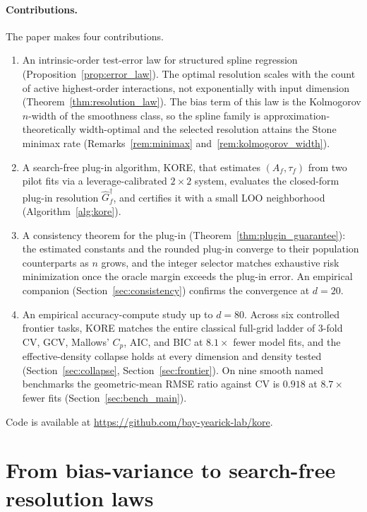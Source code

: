 \documentclass{article}
\newcommand{\KORE}{\textsc{KORE}}
\begin{document}
\paragraph{Contributions.}
The paper makes four contributions.
\begin{enumerate}
    \item An intrinsic-order test-error law for structured spline regression (Proposition~\ref{prop:error_law}). The optimal resolution scales with the count of active highest-order interactions, not exponentially with input dimension (Theorem~\ref{thm:resolution_law}). The bias term of this law is the Kolmogorov $n$-width of the smoothness class, so the spline family is approximation-theoretically width-optimal and the selected resolution attains the Stone minimax rate (Remarks~\ref{rem:minimax} and~\ref{rem:kolmogorov_width}).
    \item A search-free plug-in algorithm, \KORE{}, that estimates $(A_f, \tau_f)$ from two pilot fits via a leverage-calibrated $2\times2$ system, evaluates the closed-form plug-in resolution $\widehat{G}_f^\dagger$, and certifies it with a small LOO neighborhood (Algorithm~\ref{alg:kore}).
    \item A consistency theorem for the plug-in (Theorem~\ref{thm:plugin_guarantee}): the estimated constants and the rounded plug-in converge to their population counterparts as $n$ grows, and the integer selector matches exhaustive risk minimization once the oracle margin exceeds the plug-in error. An empirical companion (Section~\ref{sec:consistency}) confirms the convergence at $d = 20$.
    \item An empirical accuracy-compute study up to $d = 80$. Across six controlled frontier tasks, \KORE{} matches the entire classical full-grid ladder of $3$-fold CV, GCV, Mallows' $C_p$, AIC, and BIC at $8.1\times$ fewer model fits, and the effective-density collapse holds at every dimension and density tested (Section~\ref{sec:collapse}, Section~\ref{sec:frontier}). On nine smooth named benchmarks the geometric-mean RMSE ratio against CV is $0.918$ at $8.7\times$ fewer fits (Section~\ref{sec:bench_main}).
\end{enumerate}
Code is available at \url{https://github.com/bay-yearick-lab/kore}.


\section{From bias-variance to search-free resolution laws}
\label{sec:law}
\end{document}
